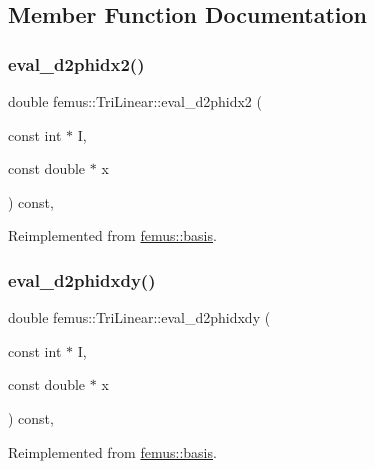 \subsection{Member Function Documentation}
\mbox{\label{classfemus_1_1_tri_linear_acdd74b2d1bf8e72765539fa6a6a2044d}} 
\subsubsection{\texorpdfstring{eval\+\_\+d2phidx2()}{eval\_d2phidx2()}}
{\footnotesize\ttfamily double femus\+::\+Tri\+Linear\+::eval\+\_\+d2phidx2 (\begin{DoxyParamCaption}\item[{const int $\ast$}]{I,  }\item[{const double $\ast$}]{x }\end{DoxyParamCaption}) const\hspace{0.3cm}{\ttfamily [inline]}, {\ttfamily [virtual]}}



Reimplemented from \mbox{\hyperlink{classfemus_1_1basis_a0a9839e75d1c9c8302486fc072eed028}{femus\+::basis}}.

\mbox{\label{classfemus_1_1_tri_linear_ae19bb78f1fd3b9b810d32f561a4bb666}} 
\subsubsection{\texorpdfstring{eval\+\_\+d2phidxdy()}{eval\_d2phidxdy()}}
{\footnotesize\ttfamily double femus\+::\+Tri\+Linear\+::eval\+\_\+d2phidxdy (\begin{DoxyParamCaption}\item[{const int $\ast$}]{I,  }\item[{const double $\ast$}]{x }\end{DoxyParamCaption}) const\hspace{0.3cm}{\ttfamily [inline]}, {\ttfamily [virtual]}}



Reimplemented from \mbox{\hyperlink{classfemus_1_1basis_ac9feaf9e60421143db2a3708f3c7fa48}{femus\+::basis}}.

